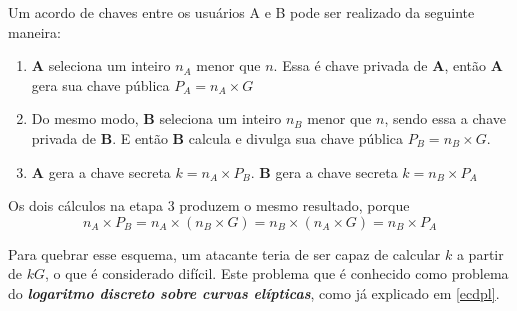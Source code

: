 Um acordo de chaves entre os usuários A e B pode ser realizado da seguinte maneira:
\begin{enumerate}
\item \textbf{A} seleciona um inteiro \(n_A\) menor que \(n\). Essa é chave privada de \textbf{A}, então \textbf{A} gera sua chave pública $P_A = n_A \times G$
\item Do mesmo modo, \textbf{B} seleciona um inteiro \(n_B\) menor que \(n\), sendo essa a chave privada de \textbf{B}. E então \textbf{B} calcula e divulga sua chave pública $P_B = n_B \times G$.
\item \textbf{A} gera a chave secreta $k = n_A \times P_B$. \textbf{B} gera a chave secreta $k = n_B \times P_A$
\end{enumerate}

Os dois cálculos na etapa 3 produzem o mesmo resultado, porque
\begin{equation*}
n_A \times P_B = n_A \times (n_B \times G) = n_B \times (n_A \times G) = n_B \times P_A
\end{equation*}

Para quebrar esse esquema, um atacante teria de ser capaz de calcular \(k\) a partir de \(kG\), o que é considerado difícil. Este problema que é conhecido como problema do \textit{\textbf{logaritmo discreto sobre curvas elípticas}}, como já explicado em \ref{ecdpl}.
